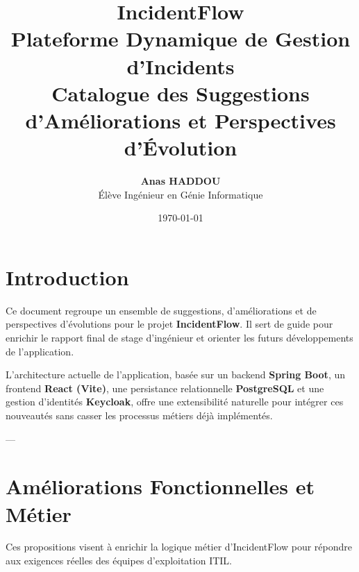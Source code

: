 \documentclass[12pt,a4paper]{article}
\title{
    \vspace{1cm}
    \textbf{\Huge IncidentFlow}\\[0.5cm]
    \Large Plateforme Dynamique de Gestion d'Incidents\\[1.5cm]
    \textbf{\Large Catalogue des Suggestions d'Améliorations et Perspectives d'Évolution}
    \vspace{1.5cm}
}
\author{\textbf{Anas HADDOU} \\ Élève Ingénieur en Génie Informatique}
\date{\today}
\begin{document}
\maketitle
\thispagestyle{empty}
\clearpage

\tableofcontents
\clearpage

\section{Introduction}
Ce document regroupe un ensemble de suggestions, d'améliorations et de perspectives d'évolutions pour le projet \textbf{IncidentFlow}. Il sert de guide pour enrichir le rapport final de stage d'ingénieur et orienter les futurs développements de l'application. 

L'architecture actuelle de l'application, basée sur un backend \textbf{Spring Boot}, un frontend \textbf{React (Vite)}, une persistance relationnelle \textbf{PostgreSQL} et une gestion d'identités \textbf{Keycloak}, offre une extensibilité naturelle pour intégrer ces nouveautés sans casser les processus métiers déjà implémentés.

---

\section{Améliorations Fonctionnelles et Métier}
Ces propositions visent à enrichir la logique métier d'IncidentFlow pour répondre aux exigences réelles des équipes d'exploitation ITIL.
\end{document}
